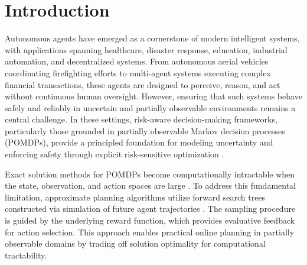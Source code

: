 \documentclass[acmlarge, manuscript, screen, review, natbib=false, oneside]{acmart}
\begin{document}
\section{Introduction}
Autonomous agents have emerged as a cornerstone of modern intelligent systems, with applications spanning healthcare, disaster response, education, industrial automation, and decentralized systems. From autonomous aerial vehicles coordinating firefighting efforts to multi-agent systems executing complex financial transactions, these agents are designed to perceive, reason, and act without continuous human oversight. However, ensuring that such systems behave safely and reliably in uncertain and partially observable environments remains a central challenge. In these settings, risk-aware decision-making frameworks, particularly those grounded in partially observable Markov decision processes (POMDPs), provide a principled foundation for modeling uncertainty and enforcing safety through explicit risk-sensitive optimization \cite{marecki2010risk, hou2016solving, ahmadi2023risk}.

Exact solution methods for POMDPs become computationally intractable when the state, observation, and action spaces are large \cite{papa_mdp_complexity}. To address this fundamental limitation, approximate planning algorithms utilize forward search trees constructed via simulation of future agent trajectories \cite{silver2010monte, sunberg2018online}. The sampling procedure is guided by the underlying reward function, which provides evaluative feedback for action selection. This approach enables practical online planning in partially observable domains by trading off solution optimality for computational tractability.
\end{document}
